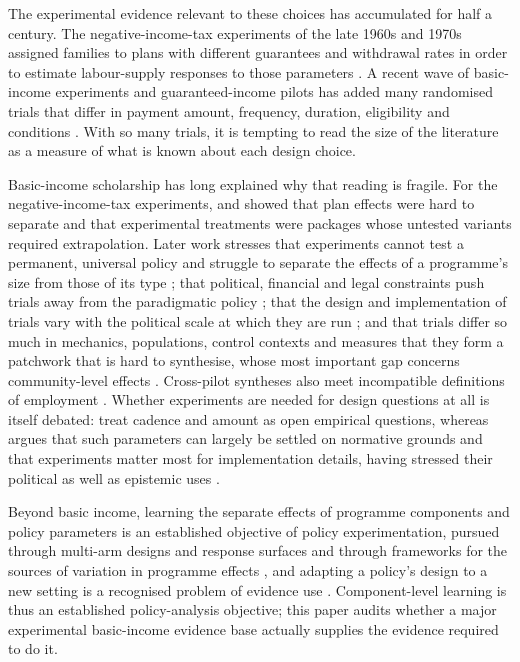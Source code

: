 \documentclass[11pt]{article}
\begin{document}
The experimental evidence relevant to these choices has accumulated for half a century. The negative-income-tax experiments of the late 1960s and 1970s assigned families to plans with different guarantees and withdrawal rates in order to estimate labour-supply responses to those parameters \citep{orrgubits2023}. A recent wave of basic-income experiments and guaranteed-income pilots has added many randomised trials that differ in payment amount, frequency, duration, eligibility and conditions \citep{chrisp2022,doussard2026}. With so many trials, it is tempting to read the size of the literature as a measure of what is known about each design choice.

Basic-income scholarship has long explained why that reading is fragile. For the negative-income-tax experiments, \citet{burtless1986} and \citet{elmore1986} showed that plan effects were hard to separate and that experimental treatments were packages whose untested variants required extrapolation. Later work stresses that experiments cannot test a permanent, universal policy and struggle to separate the effects of a programme's size from those of its type \citep{widerquist2018}; that political, financial and legal constraints push trials away from the paradigmatic policy \citep{neuwinger2022}; that the design and implementation of trials vary with the political scale at which they are run \citep{dewispelaere2025}; and that trials differ so much in mechanics, populations, control contexts and measures that they form a patchwork that is hard to synthesise, whose most important gap concerns community-level effects \citep{doussard2026}. Cross-pilot syntheses also meet incompatible definitions of employment \citep{corinth2026}. Whether experiments are needed for design questions at all is itself debated: \citet{castro2022} treat cadence and amount as open empirical questions, whereas \citet{lain2022b} argues that such parameters can largely be settled on normative grounds and that experiments matter most for implementation details, having stressed their political as well as epistemic uses \citep{lain2022a}.

Beyond basic income, learning the separate effects of programme components and policy parameters is an established objective of policy experimentation, pursued through multi-arm designs and response surfaces \citep{orrgubits2023} and through frameworks for the sources of variation in programme effects \citep{weiss2014}, and adapting a policy's design to a new setting is a recognised problem of evidence use \citep{williams2020}. Component-level learning is thus an established policy-analysis objective; this paper audits whether a major experimental basic-income evidence base actually supplies the evidence required to do it.
\end{document}
